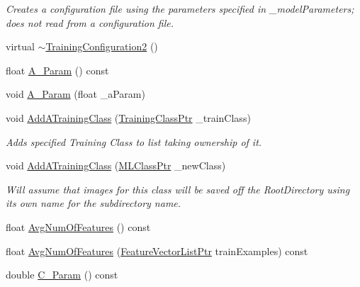 \begin{DoxyCompactItemize}
\begin{DoxyCompactList}\small\item\em Creates a configuration file using the parameters specified in \textquotesingle{}\+\_\+model\+Parameters\textquotesingle{}; does not read from a configuration file. \end{DoxyCompactList}\item 
virtual \hyperlink{class_k_k_m_l_l_1_1_training_configuration2_ae34849ba2634caf398cff724397bdfcb}{$\sim$\+Training\+Configuration2} ()
\item 
float \hyperlink{class_k_k_m_l_l_1_1_training_configuration2_a073c72851aa5962ca102568ac89a66d7}{A\+\_\+\+Param} () const 
\item 
void \hyperlink{class_k_k_m_l_l_1_1_training_configuration2_a19970762280a426e5cabfe2a7108a79b}{A\+\_\+\+Param} (float \+\_\+a\+Param)
\item 
void \hyperlink{class_k_k_m_l_l_1_1_training_configuration2_a2479c75fd5deb8d82b05028a1b158a75}{Add\+A\+Training\+Class} (\hyperlink{namespace_k_k_m_l_l_aee99044bdeeb0a43cdc845c2c01b1c14}{Training\+Class\+Ptr} \+\_\+train\+Class)
\begin{DoxyCompactList}\small\item\em Adds specified Training Class to list taking ownership of it. \end{DoxyCompactList}\item 
void \hyperlink{class_k_k_m_l_l_1_1_training_configuration2_a31d86a292dca0a5249a654662adbb422}{Add\+A\+Training\+Class} (\hyperlink{namespace_k_k_m_l_l_ac272393853d59e72e8456f14cd6d8c23}{M\+L\+Class\+Ptr} \+\_\+new\+Class)
\begin{DoxyCompactList}\small\item\em Will assume that images for this class will be saved off the Root\+Directory using its own name for the subdirectory name. \end{DoxyCompactList}\item 
float \hyperlink{class_k_k_m_l_l_1_1_training_configuration2_a0dd35218c2b01052b20c5c69e01f7215}{Avg\+Num\+Of\+Features} () const 
\item 
float \hyperlink{class_k_k_m_l_l_1_1_training_configuration2_a1690fe667d6dee8b00ea7635775f7e07}{Avg\+Num\+Of\+Features} (\hyperlink{namespace_k_k_m_l_l_acf2ba92a3cf03e2b19674b24ff488ef6}{Feature\+Vector\+List\+Ptr} train\+Examples) const 
\item 
double \hyperlink{class_k_k_m_l_l_1_1_training_configuration2_ae290e61f06531295d97c83ae548a63fd}{C\+\_\+\+Param} () const 
\item 

\end{DoxyCompactItemize}
